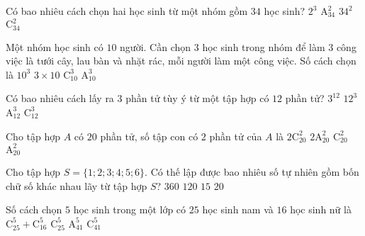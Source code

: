 \begin{ex}%
Có bao nhiêu cách chọn hai học sinh từ một nhóm gồm $34$ học sinh?
\choice
{$2^{3}$}
{$\mathrm{A}_{34}^{2}$}
{$34^{2}$}
{\True $\mathrm{C}_{34}^{2}$}
\end{ex}

\begin{ex}%
Một nhóm học sinh có $10$ người. Cần chọn $3$ học sinh trong nhóm để làm $3$ công việc là tưới cây, lau bàn và nhặt rác, mỗi người làm một công việc. Số cách chọn là
\choice
{$10^{3}$}
{$3\times 10$}
{$\mathrm{C}_{10}^{3}$}
{\True $\mathrm{A}_{10}^{3}$}
\end{ex}

\begin{ex}%
Có bao nhiêu cách lấy ra $3$ phần tử tùy ý từ một tập hợp có $12$ phần tử?
\choice
{$3^{12}$}
{$12^{3}$}
{$\mathrm{A}_{12}^{3}$}
{\True $\mathrm{C}_{12}^{3}$}
\end{ex}

\begin{ex}%
Cho tập hợp $A$ có $20$ phần tử, số tập con có $2$ phần tử của $A$ là
\choice
{$2\mathrm{C}_{20}^{2}$}
{$2\mathrm{A}_{20}^{2}$}
{\True $\mathrm{C}_{20}^{2}$}
{$\mathrm{A}_{20}^{2}$}
\end{ex}

\begin{ex}%
Cho tập hợp $S=\{1; 2; 3; 4; 5; 6\}$. Có thế lập được bao nhiêu số tự nhiên gồm bốn chữ số khác nhau lãy từ tập hợp $S$?
\choice
{\True $360$}
{$120$}
{$15$}
{$20$}
\end{ex}

\begin{ex}%
Số cách chọn $5$ học sinh trong một lớp có $25$ học sinh nam và $16$ học sinh nữ là
\choice
{$\mathrm{C}_{25}^{5}+\mathrm{C}_{16}^{5}$}
{$\mathrm{C}_{25}^{5}$}
{$\mathrm{A}_{41}^{5}$}
{\True $\mathrm{C}_{41}^{5}$}
\end{ex}

